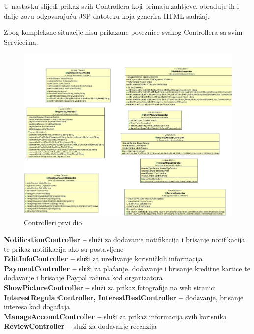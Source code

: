 		\normalfont U nastavku slijedi prikaz svih Controllera koji primaju zahtjeve, obrađuju ih i dalje zovu odgovarajuću JSP datoteku koja generira HTML sadržaj. 
		
		\normalfont\noindent Zbog kompleksne situacije nisu prikazane poveznice svakog Controllera sa svim Serviceima.
		
		\begin{figure}[H]
			\includegraphics[scale=0.4]{slike/dijagram3a.jpg}
			\centering
			\caption{Controlleri prvi dio}
			\label{fig:dijagramraz5}
		\end{figure}
	
	\noindent\textbf{NotificationController – } služi za dodavanje notifikacija i brisanje notifikacija te prikaz notifikacija ako su postavljene\\
	\textbf{EditInfoController – } služi za uređivanje korisničkih informacija\\
	\textbf{PaymentController – } služi za plaćanje, dodavanje i brisanje kreditne kartice te dodavanje i brisanje Paypal računa kod organizatora\\
	\textbf{ShowPictureController – } služi za prikaz fotografija na web stranici\\
	\textbf{InterestRegularController, InterestRestController – } dodavanje, brisanje interesa  kod događaja\\
	\textbf{ManageAccountController – } služi za prikaz informacija svih korisnika \\
	\textbf{ReviewController – } služi za dodavanje recenzija
	
